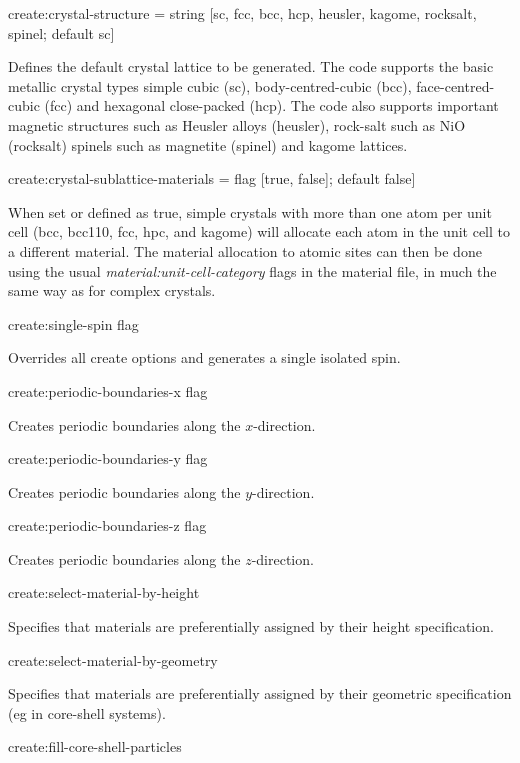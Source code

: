 {\zicf create:crystal-structure = string [sc, fcc, bcc, hcp, heusler, kagome, rocksalt, spinel; default sc]} Defines the default crystal lattice to be generated. The code supports the basic metallic crystal types simple cubic (sc), body-centred-cubic (bcc), face-centred-cubic (fcc) and hexagonal close-packed (hcp). The code also supports important magnetic structures such as Heusler alloys (heusler), rock-salt such as NiO (rocksalt) spinels such as magnetite (spinel) and kagome lattices.

{\zicf create:crystal-sublattice-materials = flag [true, false]; default false]}  When set or defined as true, simple crystals with more than one atom per unit
cell (bcc, bcc110, fcc, hpc, and kagome) will allocate each atom in the unit cell to a different material. The material allocation to atomic sites can then be done using the usual \textit{material:unit-cell-category} flags in the material file, in much the same way as for complex crystals.

{\zicf create:single-spin flag} Overrides all create options and generates a single isolated spin.

{\zicf create:periodic-boundaries-x flag} Creates periodic boundaries along the $x$-direction.

{\zicf create:periodic-boundaries-y flag} Creates periodic boundaries along the $y$-direction.

{\zicf create:periodic-boundaries-z flag} Creates periodic boundaries along the $z$-direction.

{\zicf create:select-material-by-height} Specifies that materials are preferentially assigned by their height specification.

{\zicf create:select-material-by-geometry} Specifies that materials are preferentially assigned by their geometric specification (eg in core-shell systems).

{\zicf create:fill-core-shell-particles}

